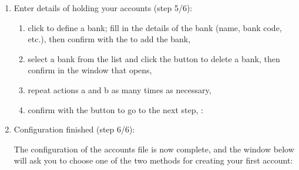 \begin{enumerate}
\begin{figure}[htbp]
	\begin{center}
		\texttt{[image: image/screenshot/start\_category\_select]}
	\end{center}
	\caption{Selection of categories to be used}%
	\label{start_category_select}
\end{figure}

		\begin{enumerate} 
			\item click on your desired category, either the  or the \footnote{ Users installing the program on a system with a French Language interface will find different categories are offered including some for business users} 
			\item check the  box to check if other categories are available\footnote{ This option is mainly for the benefit of users of a computer system with the French Language interface who will then be shown the two English categories mentioned in the previous step}
			\item confirm with the  button;
		\end{enumerate}
	\item Enter details of  holding your accounts (step 5/6):
		\begin{enumerate} 
 			\item click  to define a bank; fill in the details of the bank (name, bank code, etc.), then confirm with the  to add the bank,
			\item select a bank from the list and click the  button to delete a bank, then confirm in the window that opens,
			\item repeat actions a and b as many times as necessary,
			\item confirm with the  button to go to the next step, :
		\end{enumerate} 

	\item Configuration finished (step 6/6):\par

	The configuration of the accounts file is now complete, and the window below will ask you to choose one of the two methods for creating your first account:


\end{enumerate}
